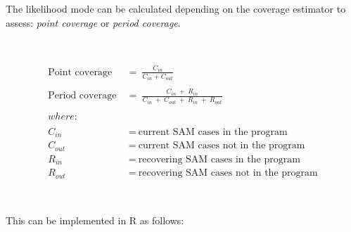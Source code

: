 \documentclass[12pt,a4paper]{article}
\newenvironment{Shaded}{\begin{snugshade}}{\end{snugshade}}
\newcommand{\KeywordTok}[1]{\textcolor[rgb]{0.13,0.29,0.53}{\textbf{#1}}}
\newcommand{\StringTok}[1]{\textcolor[rgb]{0.31,0.60,0.02}{#1}}
\newcommand{\OperatorTok}[1]{\textcolor[rgb]{0.81,0.36,0.00}{\textbf{#1}}}
\newcommand{\NormalTok}[1]{#1}
\begin{document}
The likelihood mode can be calculated depending on the coverage
estimator to assess: \emph{point coverage} or \emph{period coverage}.

~

\[\begin{aligned}
\text{Point coverage} ~ & = ~ \frac{C_{in}}{C_{in} + C_{out}} \\
\\
\text{Period coverage} ~ & = ~ \frac{C_{in} ~ + ~ R_{in}}{C_{in} ~ + ~ C_{out} ~ + ~ R_{in} ~ + ~ R_{out}}\\
\\
where: & \\
\\
C_{in} & ~ = ~ \text{current SAM cases in the program} \\
C_{out} & ~ = ~ \text{current SAM cases not in the program} \\ 
R_{in} & ~ = ~ \text{recovering SAM cases in the program} \\
R_{out} & ~ = ~ \text{recovering SAM cases not in the program}
\end{aligned}\]

~

This can be implemented in R as follows:

~

\begin{Shaded}
\end{Shaded}
\end{document}
